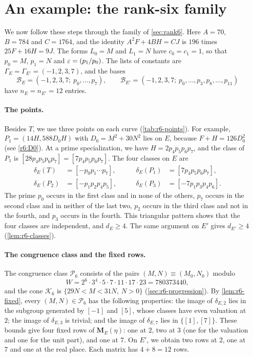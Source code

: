 \documentclass[12pt,oneside,openany]{book}
\theoremstyle{definition}
\theoremstyle{plain}
\numberwithin{equation}{chapter}
\theoremstyle{plain}
\theoremstyle{definition}
\theoremstyle{remark}
\newcommand{\leg}[2]{\mathchoice{\left(\frac{#1}{#2}\right)}{(#1/#2)}{(#1/#2)}{(#1/#2)}}
\newcommand{\sq}[1]{[#1]}
\newcommand{\cB}{\mathcal B}
\newcommand{\cP}{\mathcal P}
\newcommand{\cK}{\mathcal K}
\newcommand{\eps}{\varepsilon}
\begin{document}
\section{An example: the rank-six family}\label{sec:overview-example}

We now follow these steps through the family of \cref{sec:rank6}. Here $A=70$, $B=784$ and $C=1764$, and the identity $A^2F+4BH=CJ$ is $196$ times $25F+16H=9J$. The forms $L_0=M$ and $L_1=N$ have $c_0=c_1=1$, so that $p_0=M$, $p_1=N$ and $\eps=\leg{p_1}{p_0}$. The lists of constants are $\Gamma_E=\Gamma_{E'}=(-1,2,3,7)$, and the bases
\begin{equation*}
\cB_E=(-1,2,3,7;\ p_0,\dots,p_7),\qquad\cB_{E'}=(-1,2,3,7;\ p_0,\dots,p_3,p_8,\dots,p_{11})
\end{equation*}
have $n_E=n_{E'}=12$ entries.

\paragraph{The points.} Besides $T$, we use three points on each curve (\cref{tab:r6-points}). For example, $P_1=(14H,588D_0H)$ with $D_0=M^2+30N^2$ lies on $E$, because $F+H=126D_0^2$ (see \eqref{r6:D0}). At a prime specialization, we have $H=2p_4p_5p_6p_7$, and the class of $P_1$ is $\sq{28p_4p_5p_6p_7}=\sq{7p_4p_5p_6p_7}$. The four classes on $E$ are
\begin{equation*}
\begin{aligned}
\delta_E(T)&=\sq{-p_0p_1\cdots p_7},&\qquad\delta_E(P_1)&=\sq{7p_4p_5p_6p_7},\\
\delta_E(P_2)&=\sq{-p_1p_2p_4p_5},&\qquad\delta_E(P_3)&=\sq{-7p_1p_3p_4p_6}.
\end{aligned}
\end{equation*}
The prime $p_0$ occurs in the first class and in none of the others, $p_7$ occurs in the second class and in neither of the last two, $p_2$ occurs in the third class and not in the fourth, and $p_3$ occurs in the fourth. This triangular pattern shows that the four classes are independent, and $d_E\ge4$. The same argument on $E'$ gives $d_{E'}\ge4$ (\cref{lem:r6-classes}).

\paragraph{The congruence class and the fixed rows.} The congruence class $\cP_6$ consists of the pairs $(M,N)\equiv(M_0,N_0)$ modulo
\begin{equation*}
W=2^6\cdot3^4\cdot5\cdot7\cdot11\cdot17\cdot23=780373440,
\end{equation*}
and the cone $\cK_6$ is $\{29N<M<31N,\ N>0\}$ (\cref{sec:r6-progression}). By \cref{lem:r6-fixed}, every $(M,N)\in\cP_6$ has the following properties: the image of $\delta_{E,2}$ lies in the subgroup generated by $\sq{-1}$ and $\sq5$, whose classes have even valuation at $2$; the image of $\delta_{E,3}$ is trivial; and the image of $\delta_{E,7}$ lies in $\{\sq1,\sq7\}$. These bounds give four fixed rows of $\mathbf M_E(\eta)$: one at $2$, two at $3$ (one for the valuation and one for the unit part), and one at $7$. On $E'$, we obtain two rows at $2$, one at $7$ and one at the real place. Each matrix has $4+8=12$ rows.
\end{document}
